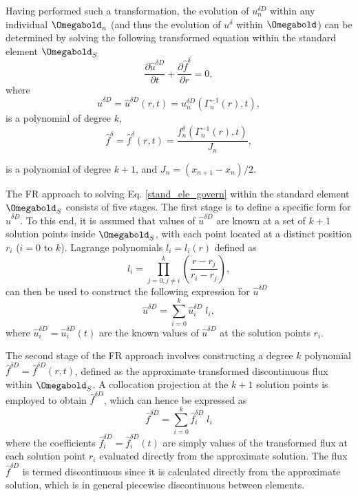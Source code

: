 \vspace{0.1 in}
\noindent Having performed such a transformation, the evolution of $u_n^{\delta D}$ within any individual $\Omegabold_n$ (and thus the evolution of $u^{\delta}$ within $\Omegabold$) can be determined by solving the following transformed equation within the standard element $\Omegabold_S$
\begin{equation}
\frac{\partial\hat{u}^{\delta D}}{\partial t}+\frac{\partial\hat{f}^{\delta}}{\partial r}=0,
\label{stand_ele_govern}
\end{equation}
where
\begin{equation}
\hat{u}^{\delta D}=\hat{u}^{\delta D}(r,t)=u^{\delta D}_n(\Gamma_n^{-1}(r),t),
\end{equation}
is a polynomial of degree $k$,
\begin{equation}
\hat{f}^{\delta}=\hat{f}^{\delta}(r,t)=\frac{f^{\delta}_n(\Gamma_n^{-1}(r),t)}{J_n} ,
\end{equation}

\vspace{0.1 in}
\noindent is a polynomial of degree $k+1$, and $J_n=(x_{n+1}-x_{n})/2$. 

\vspace{0.2 in}
\noindent The FR approach to solving Eq. \eqref{stand_ele_govern} within the standard element $\Omegabold_S$ consists of five stages. The first stage is to define a specific form for $\hat{u}^{\delta D}$. To this end, it is assumed that values of $\hat{u}^{\delta D}$ are known at a set of $k+1$ solution points inside $\Omegabold_S$, with each point located at a distinct position $r_i$ ($i=0$ to $k$). Lagrange polynomials $l_i=l_i(r)$ defined as
\begin{equation}
l_i=\prod_{j=0, j\neq i}^{k}\left(\frac{r-r_j}{r_i-r_j}\right),
\end{equation}
can then be used to construct the following expression for
$\hat{u}^{\delta D}$
\begin{equation}
\hat{u}^{\delta D}=\sum_{i=0}^{k}\hat{u}^{\delta D}_{i}\;l_i,
\label{trans_soln}
\end{equation}
where $\hat{u}^{\delta D}_{i}=\hat{u}^{\delta D}_{i}(t)$ are the known values of $\hat{u}^{\delta D}$ at the solution points $r_i$.

\vspace{0.1 in}
\noindent The second stage of the FR approach involves constructing a degree $k$ polynomial $\hat{f}^{\delta D}=\hat{f}^{\delta D}(r,t)$, defined as the approximate transformed discontinuous flux within $\Omegabold_S$. A collocation projection at the $k+1$ solution points is employed to obtain $\hat{f}^{\delta D}$, which can hence be expressed as
\begin{equation}
\hat{f}^{\delta D}=\sum_{i=0}^{k}\hat{f}^{\delta D}_{i}\;l_i
\end{equation}
where the coefficients $\hat{f}^{\delta D}_{i}=\hat{f}^{\delta D}_{i}(t)$ are simply values of the transformed flux at each solution point $r_i$ evaluated directly from the approximate solution. The flux $\hat{f}^{\delta D}$ is termed discontinuous since it is calculated directly from the approximate solution, which is in general piecewise discontinuous between elements.

